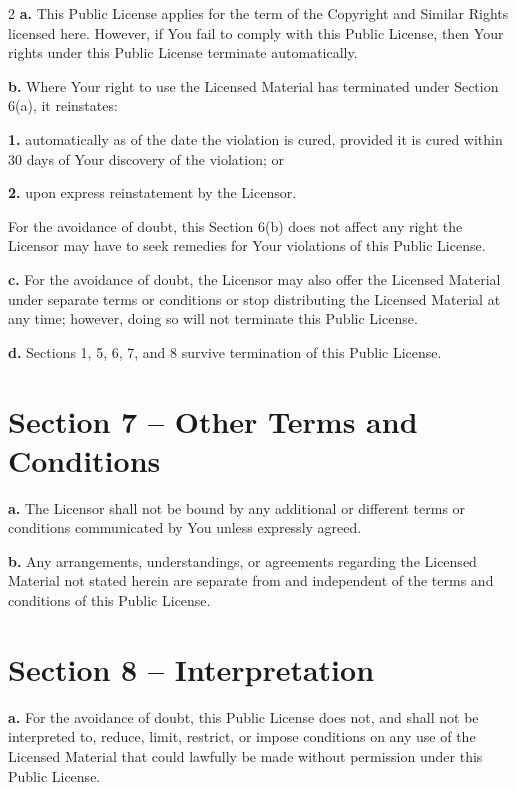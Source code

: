 \begin{multicols*}{2}
    \textbf{a.} This Public License applies for the term of the Copyright and
    Similar Rights licensed here. However, if You fail to comply with this
    Public License, then Your rights under this Public License terminate
    automatically.

    \textbf{b.} Where Your right to use the Licensed Material has terminated
    under Section 6(a), it reinstates:

    \textbf{1.} automatically as of the date the violation is cured, provided it
    is cured within 30 days of Your discovery of the violation; or

    \textbf{2.} upon express reinstatement by the Licensor.

    For the avoidance of doubt, this Section 6(b) does not affect any
    right the Licensor may have to seek remedies for Your violations of
    this Public License.

    \textbf{c.} For the avoidance of doubt, the Licensor may also offer the
    Licensed Material under separate terms or conditions or stop
    distributing the Licensed Material at any time; however, doing so will
    not terminate this Public License.

    \textbf{d.} Sections 1, 5, 6, 7, and 8 survive termination of this Public
    License.


    \section*{Section 7 -- Other Terms and Conditions}

    \textbf{a.} The Licensor shall not be bound by any additional or different
    terms or conditions communicated by You unless expressly agreed.

    \textbf{b.} Any arrangements, understandings, or agreements regarding the
    Licensed Material not stated herein are separate from and independent
    of the terms and conditions of this Public License.


    \section*{Section 8 -- Interpretation}

    \textbf{a.} For the avoidance of doubt, this Public License does not, and
    shall not be interpreted to, reduce, limit, restrict, or impose
    conditions on any use of the Licensed Material that could lawfully be
    made without permission under this Public License.


\end{multicols*}
